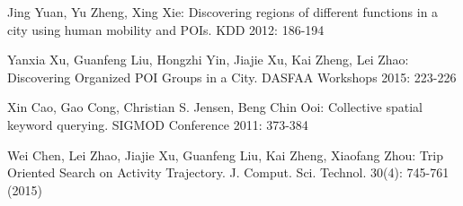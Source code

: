 \documentclass[envcountreset,oribibl]{llncs}
\begin{document}
\begin{thebibliography}{4}

Jing Yuan, Yu Zheng, Xing Xie: Discovering regions of different functions in a city using human mobility and POIs. KDD 2012: 186-194

Yanxia Xu, Guanfeng Liu, Hongzhi Yin, Jiajie Xu, Kai Zheng, Lei Zhao: Discovering Organized POI Groups in a City. DASFAA Workshops 2015: 223-226

Xin Cao, Gao Cong, Christian S. Jensen, Beng Chin Ooi: Collective spatial keyword querying. SIGMOD Conference 2011: 373-384

Wei Chen, Lei Zhao, Jiajie Xu, Guanfeng Liu, Kai Zheng, Xiaofang Zhou: Trip Oriented Search on Activity Trajectory. J. Comput. Sci. Technol. 30(4): 745-761 (2015)

\end{thebibliography}
\end{document}
